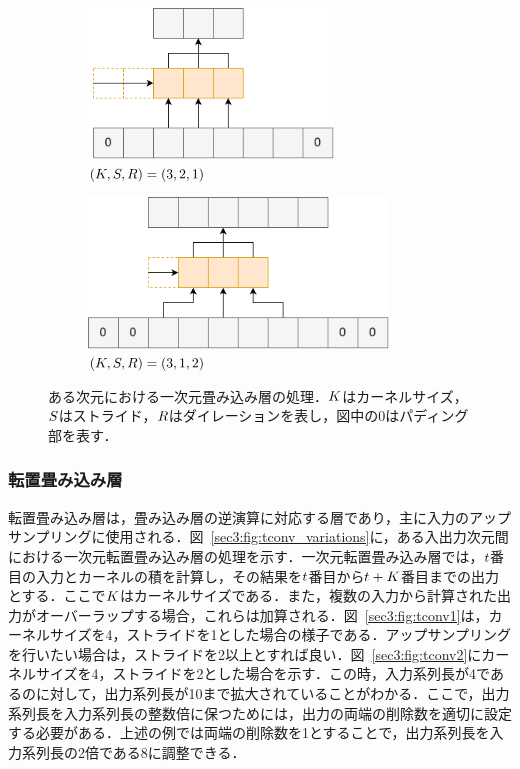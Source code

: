 \begin{figure}[tb]
    \begin{subfigure}[b]{0.48\textwidth}
        \centering
        \includegraphics[height=4cm]{./figure/sec3/conv3.drawio.png}
        \caption{$\left(K, S, R\right) = \left(3, 2, 1\right)$}
        \label{sec3:fig:conv3}
    \end{subfigure}
    \begin{subfigure}[b]{0.48\textwidth}
        \centering
        \includegraphics[height=4cm]{./figure/sec3/conv4.drawio.png}
        \caption{$\left(K, S, R\right) = \left(3, 1, 2\right)$}
        \label{sec3:fig:conv4}
    \end{subfigure}
    \caption{ある次元における一次元畳み込み層の処理．$K$はカーネルサイズ，$S$はストライド，$R$はダイレーションを表し，図中の0はパディング部を表す．}
    \label{sec3:fig:conv_variations}
\end{figure}

\subsubsection{転置畳み込み層}
転置畳み込み層は，畳み込み層の逆演算に対応する層であり，主に入力のアップサンプリングに使用される．図~\ref{sec3:fig:tconv_variations}に，ある入出力次元間における一次元転置畳み込み層の処理を示す．一次元転置畳み込み層では，$t$番目の入力とカーネルの積を計算し，その結果を$t$番目から$t + K$番目までの出力とする．ここで$K$はカーネルサイズである．また，複数の入力から計算された出力がオーバーラップする場合，これらは加算される．図~\ref{sec3:fig:tconv1}は，カーネルサイズを4，ストライドを1とした場合の様子である．アップサンプリングを行いたい場合は，ストライドを2以上とすれば良い．図~\ref{sec3:fig:tconv2}にカーネルサイズを4，ストライドを2とした場合を示す．この時，入力系列長が4であるのに対して，出力系列長が10まで拡大されていることがわかる．ここで，出力系列長を入力系列長の整数倍に保つためには，出力の両端の削除数を適切に設定する必要がある．上述の例では両端の削除数を1とすることで，出力系列長を入力系列長の2倍である8に調整できる．

